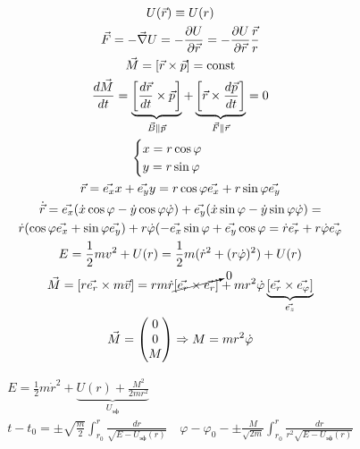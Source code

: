 \documentclass[12pt, a4paper]{report}
\begin{document}
\begin{gather*}
    U(\vec{r})\equiv  U ( r)\\
    \vec{F}= - \vec{\nabla }U = - \frac{\partial U}{\partial \vec{r}}= - \frac{\partial U}{\partial \vec{r}} \frac{\vec{r}}{r}    \\
    \vec{M}= [ \vec{r}\times \vec{p }]= \mathrm{const} \\
    \frac{d \vec{M}}{d t }= \underbrace{\left[ \frac{d \vec{ r }} { d t}\times  \vec{p}  \right]}_{\vec{B} \parallel \vec{p}  }    + \underbrace{\left[ \vec{r} \times \frac{d \vec{p}}{d t} \right]}_{\vec{F} \parallel \vec{r} }  =0 \\
    \begin{aligned}
        \begin{cases}
            x= r \cos  \varphi \\    
            y = r \sin  \varphi 
        \end{cases}
        \quad  
    \end{aligned} \\
    \vec{r}= \vec{e_x}x + \vec{e_y}y =  r\cos \varphi \vec{e_x} + r\sin \varphi \vec{e_y} \\  
    \dot{\vec{r}}=\vec{e _ x}( \dot{x} \cos \varphi - \dot{y} \cos  \varphi \dot{\varphi}  ) + \vec{e_y}( \dot{x} \sin \varphi - \dot{y} \sin  \varphi \dot{\varphi}  ) = \\
    \dot{r}( \cos \varphi \vec{e_x} + \sin \varphi \vec{e_y})+ r \dot{ \varphi}(- \vec{e_x} \sin \varphi + \vec{e_y} \cos \varphi = \dot{r} \vec{e_r}+r \dot{\varphi} \vec{e _{\varphi} } \\
    E = \frac{1}{ 2} m v ^2 + U ( r) = \frac{1}{2 }m ( \dot{ r } ^2+ ( r \dot{\varphi}) ^2  ) + U ( r)     \\
    \vec{M} = [ r \vec{ e_r}\times  m \vec{ v}]= r m \dot{r } \cancelto{0}{[\vec{e_r}\times \vec{e_r}]}+ m r ^2 \dot{\varphi} \underbrace{[\vec{e_r}\times  \vec{ e _{\varphi} }]}_{\vec{e_z}}  \\
    \vec{M}=\begin{pmatrix}
    0\\
    0\\
    M
    \end{pmatrix} \Rightarrow M = m r ^2 \dot{\varphi}  
\end{gather*}

\begin{gather*}
    E = \frac{1}{ 2 } m \dot{r} ^2 +  \underbrace{U(r) + \frac{M ^2}{2 mr ^2 }}_{U_{\text{эф}}}     \\
    t-t_0 = \pm  \sqrt{\frac{m}{2} } \int_{ r_0}^{r}   \frac{dr}{\sqrt{E - U _{\text{эф}}(r) }} \quad  \varphi - \varphi_0 - \pm \frac{M}{\sqrt{2m}} \int_{r_0}^{r} \frac{dr}{r ^2 \sqrt{E - U _{\text{эф}}(r) }}   
\end{gather*}
\end{document}
